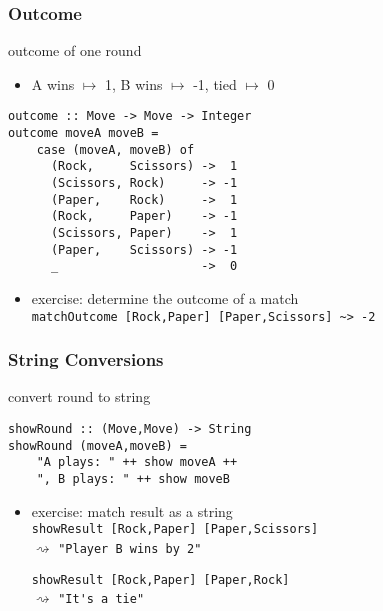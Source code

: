 \documentclass[dvipsnames]{beamer}
\theoremstyle{plain}
\begin{document}
\begin{frame}[fragile]
  \frametitle{Outcome}


  \begin{exampleblock}{outcome of one round}
    \begin{itemize}
      \item A wins $\mapsto$ 1, B wins $\mapsto$ -1, tied $\mapsto$ 0
    \end{itemize}
    \begin{lstlisting}
outcome :: Move -> Move -> Integer
outcome moveA moveB =
    case (moveA, moveB) of
      (Rock,     Scissors) ->  1
      (Scissors, Rock)     -> -1
      (Paper,    Rock)     ->  1
      (Rock,     Paper)    -> -1
      (Scissors, Paper)    ->  1
      (Paper,    Scissors) -> -1
      _                    ->  0
    \end{lstlisting}
  \end{exampleblock}

  \pause
  \vspace{-12pt}
  \begin{itemize}
    \item exercise: determine the outcome of a match\\
      \lstinline{matchOutcome [Rock,Paper] [Paper,Scissors] ~> -2}
  \end{itemize}
\end{frame}

\begin{frame}[fragile]
  \frametitle{String Conversions}

  \begin{exampleblock}{convert round to string}
    \begin{lstlisting}
showRound :: (Move,Move) -> String
showRound (moveA,moveB) =
    "A plays: " ++ show moveA ++
    ", B plays: " ++ show moveB
    \end{lstlisting}
  \end{exampleblock}

  \pause
  \vspace{-12pt}
  \begin{itemize}
    \item exercise: match result as a string\\
      \lstinline{showResult [Rock,Paper] [Paper,Scissors]}\\
      $\rightsquigarrow$ \lstinline{"Player B wins by 2"}

      \smallskip
      \lstinline{showResult [Rock,Paper] [Paper,Rock]}\\
      $\rightsquigarrow$ \lstinline{"It's a tie"}
  \end{itemize}
\end{frame}
\end{document}
